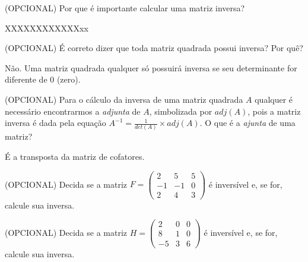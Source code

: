 \documentclass[pdftex, brazil, 12pt, oneside, addpoints]{exam}
\begin{document}
\begin{questions}
\question
(OPCIONAL) Por que é importante calcular uma matriz inversa?
\begin{solution}
  XXXXXXXXXXXXxx
\end{solution}

\question
(OPCIONAL) É correto dizer que toda matriz quadrada possui inversa?
Por quê?
\begin{solution}
  Não. Uma matriz quadrada qualquer só possuirá inversa se seu
  determinante for diferente de 0 (zero).
\end{solution}

\question
(OPCIONAL) Para o cálculo da inversa de uma matriz quadrada $A$ qualquer é
necessário encontrarmos a \emph{adjunta} de $A$, simbolizada por
$adj(A)$, pois a matriz inversa
é dada pela equação $\displaystyle A^{-1} = \frac{1}{det(A)} \times adj(A)$. O
que é a \emph{ajunta} de uma matriz?
\begin{solution}
  É a transposta da matriz de cofatores.
\end{solution}



\question
(OPCIONAL) Decida se a matriz $F = \begin{pmatrix}
  2 & 5 & 5\\
  -1 & -1 & 0\\
  2 & 4 & 3
\end{pmatrix}$ é inversível e, se for, calcule sua inversa.

\question
(OPCIONAL) Decida se a matriz $H = \begin{pmatrix}
  2 & 0 & 0\\
  8 & 1 & 0\\
  -5 & 3 & 6
\end{pmatrix}$ é inversível e, se for, calcule sua inversa.




\end{questions}
\end{document}
